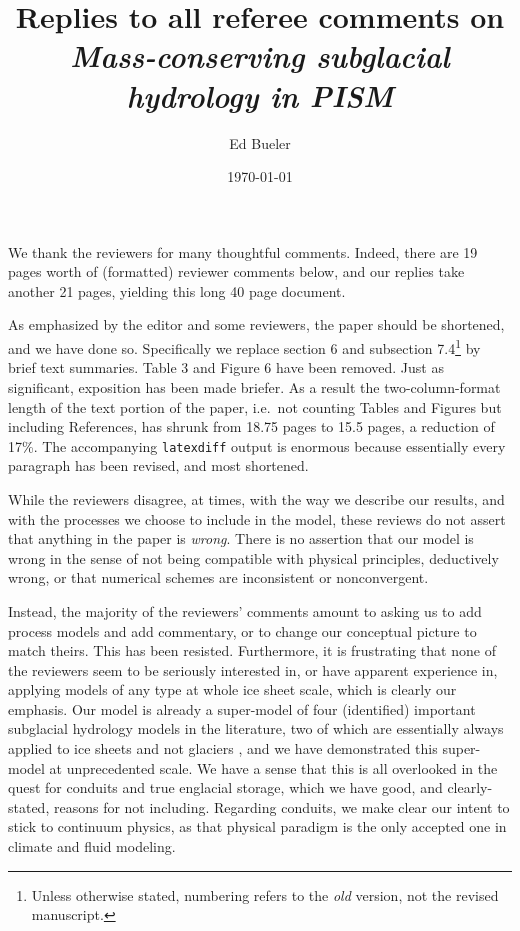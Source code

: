 \documentclass[11pt,reqno]{amsart}
\title[Replies to Referee Comments]{Replies to all referee comments on \\ \emph{Mass-conserving subglacial hydrology in PISM}}
\author{Ed Bueler}
\date{\today}
\begin{document}
\maketitle

\thispagestyle{empty}

We thank the reviewers for many thoughtful comments.  Indeed, there are 19 pages worth of (formatted) reviewer comments below, and our replies take another 21 pages, yielding this long 40 page document.

As emphasized by the editor and some reviewers, the paper should be shortened, and we have done so.  Specifically we replace section 6 and subsection 7.4\footnote{Unless otherwise stated, numbering refers to the \emph{old} version, not the revised manuscript.} by brief text summaries.  Table 3 and Figure 6 have been removed.  Just as significant, exposition has been made briefer.  As a result the two-column-format length of the text portion of the paper, i.e.~not counting Tables and Figures but including References, has shrunk from 18.75 pages to 15.5 pages, a reduction of 17\%.  The accompanying \texttt{latexdiff} output is enormous because essentially every paragraph has been revised, and most shortened.

While the reviewers disagree, at times, with the way we describe our results, and with the processes we choose to include in the model, these reviews do not assert that anything in the paper is \emph{wrong}.  There is no assertion that our model is wrong in the sense of not being compatible with physical principles, deductively wrong, or that numerical schemes are inconsistent or nonconvergent.

Instead, the majority of the reviewers' comments amount to asking us to add process models and add commentary, or to change our conceptual picture to match theirs.  This has been resisted.  Furthermore, it is frustrating that none of the reviewers seem to be seriously interested in, or have apparent experience in, applying models of any type at whole ice sheet scale, which is clearly our emphasis.  Our model is already a super-model of four (identified) important subglacial hydrology models in the literature, two of which are essentially always applied to ice sheets and not glaciers \cite{Siegertetal2009,Tulaczyketal2000}, and we have demonstrated this super-model at unprecedented scale.  We have a sense that this is all overlooked in the quest for conduits and true englacial storage, which we have good, and clearly-stated, reasons for not including.  Regarding conduits, we make clear our intent to stick to continuum physics, as that physical paradigm is the only accepted one in climate and fluid modeling.
\end{document}
